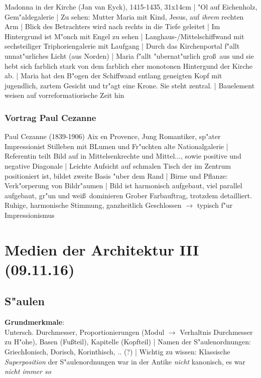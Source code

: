 \documentclass[emulatestandardclasses]{scrartcl}
\begin{document}
Madonna in der Kirche (Jan van Eyck), 1415-1435, 31x14cm | 
"Ol auf Eichenholz, Gem"aldegalerie |
Zu sehen: Mutter Maria mit Kind, Jesus, auf \emph{ihrem} rechten Arm |
Blick des Betrachters wird nach rechts in die Tiefe geleitet |
Im Hintergrund ist M"onch mit Engel zu sehen |
Langhaus-/Mittelschiffwand mit sechsteiliger Triphoriengalerie mit Laufgang |
Durch das Kirchenportal f"allt unnat"urliches Licht (aus Norden) |
Maria f"allt "ubernat"urlich gro\ss~aus und sie hebt sich farblich stark von dem farblich eher monotonen Hintergund der Kirche ab. | 
Maria hat den B"ogen der Schiffwand entlang geneigten Kopf mit jugendlich, zartem Gesicht und tr"agt eine Krone. Sie steht zentral. | Bauelement weisen auf vorreformatiorische Zeit hin

\subsubsection{Vortrag Paul Cezanne}

Paul Cezanne (1839-1906) Aix en Provence, Jung Romantiker, sp"ater Impressionist
Stilleben mit BLumen und Fr"uchten alte Nationalgalerie |
Referentin teilt Bild auf in Mittelsenkrechte und Mittel..., sowie positive und negative Diagonale |
Leichte Aufsicht auf schmalen Tisch der im Zentrum positioniert ist, bildet zweite Basis "uber dem Rand | 
Birne und Pflanze: Verk"orperung von Bildr"aumen | 
Bild ist harmonisch aufgebaut, viel parallel aufgebaut, gr"un und wei\ss~dominieren
Grober Farbauftrag, trotzdem detailliert. Ruhige, harmonische Stimmung, ganzheitlich Geschlossen $\rightarrow$ typisch f"ur Impressionismus



\section{Medien der Architektur III \\(09.11.16)}

\subsection{S"aulen}

\textbf{Grundmerkmale}:\\Untersch. Durchmesser, Proportionierungen (Modul $\rightarrow$ Verhaltnis Durchmesser zu H"ohe), Basen (Fu\ss teil), Kapitelle (Kopfteil) | Namen der S"aulenordnungen: GriechIonisch, Dorisch, Korinthisch, .. {\color{red}(?)} | Wichtig zu wissen: Klassische \emph{Superposition} der S"aulenordnungen war in der Antike \emph{nicht} kanonisch, es war \emph{nicht immer so}
\end{document}
